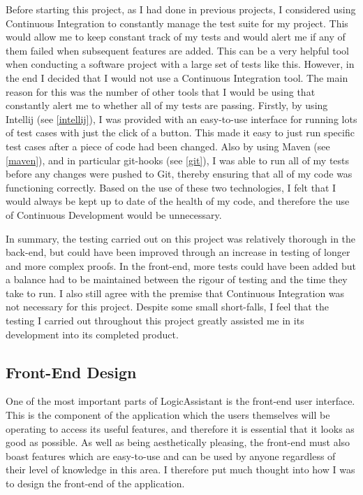 Before starting this project, as I had done in previous projects, I considered using Continuous Integration to constantly manage the test suite for my project. This would allow me to keep constant track of my tests and would alert me if any of them failed when subsequent features are added. This can be a very helpful tool when conducting a software project with a large set of tests like this. However, in the end I decided that I would not use a Continuous Integration tool. The main reason for this was the number of other tools that I would be using that constantly alert me to whether all of my tests are passing. Firstly, by using Intellij (see \ref{intellij}), I was provided with an easy-to-use interface for running lots of test cases with just the click of a button. This made it easy to just run specific test cases after a piece of code had been changed. Also by using Maven (see \ref{maven}), and in particular git-hooks (see \ref{git}), I was able to run all of my tests before any changes were pushed to Git, thereby ensuring that all of my code was functioning correctly. Based on the use of these two technologies, I felt that I would always be kept up to date of the health of my code, and therefore the use of Continuous Development would be unnecessary.

In summary, the testing carried out on this project was relatively thorough in the back-end, but could have been improved through an increase in testing of longer and more complex proofs. In the front-end, more tests could have been added but a balance had to be maintained between the rigour of testing and the time they take to run. I also still agree with the premise that Continuous Integration was not necessary for this project. Despite some small short-falls, I feel that the testing I carried out throughout this project greatly assisted me in its development into its completed product.

\subsection{Front-End Design}

One of the most important parts of LogicAssistant is the front-end user interface. This is the component of the application which the users themselves will be operating to access its useful features, and therefore it is essential that it looks as good as possible. As well as being aesthetically pleasing, the front-end must also boast features which are easy-to-use and can be used by anyone regardless of their level of knowledge in this area. I therefore put much thought into how I was to design the front-end of the application.

